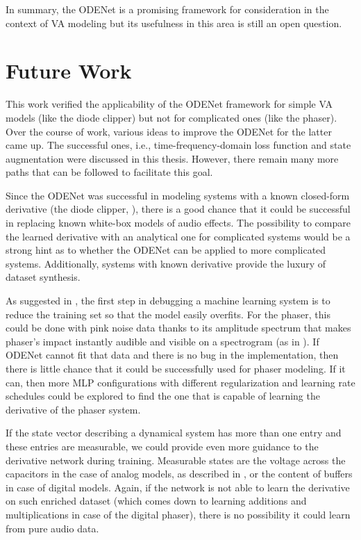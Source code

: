 In summary, the ODENet is a promising framework for consideration in the context of \ac{VA} modeling but its usefulness in this area is still an open question.

\section{Future Work}
\label{sec:future_work}

This work verified the applicability of the ODENet framework for simple \ac{VA} models (like the diode clipper) but not for complicated ones (like the phaser). Over the course of work, various ideas to improve the ODENet for the latter came up. The successful ones, i.e., time-frequency-domain loss function and state augmentation were discussed in this thesis. However, there remain many more paths that can be followed to facilitate this goal.

Since the ODENet was successful in modeling systems with a known closed-form derivative (the diode clipper, \cite{Chen2018,Karlsson2019}), there is a good chance that it could be successful in replacing known white-box models of audio effects. The possibility to compare the learned derivative with an analytical one for complicated systems would be a strong hint as to whether the ODENet can be applied to more complicated systems. Additionally, systems with known derivative provide the luxury of dataset synthesis.

As suggested in \cite{Bengio2012}, the first step in debugging a machine learning system is to reduce the training set so that the model easily overfits. For the phaser, this could be done with pink noise data thanks to its amplitude spectrum that makes phaser's impact instantly audible and visible on a spectrogram (as in ). If ODENet cannot fit that data and there is no bug in the implementation, then there is little chance that it could be successfully used for phaser modeling. If it can, then more \ac{MLP} configurations with different regularization and learning rate schedules could be explored to find the one that is capable of learning the derivative of the phaser system.

If the state vector describing a dynamical system has more than one entry and these entries are measurable, we could provide even more guidance to the derivative network during training. Measurable states are the voltage across the capacitors in the case of analog models, as described in \cite{Parker2019}, or the content of buffers in case of digital models. Again, if the network is not able to learn the derivative on such enriched dataset (which comes down to learning additions and multiplications in case of the digital phaser), there is no possibility it could learn from pure audio data.

